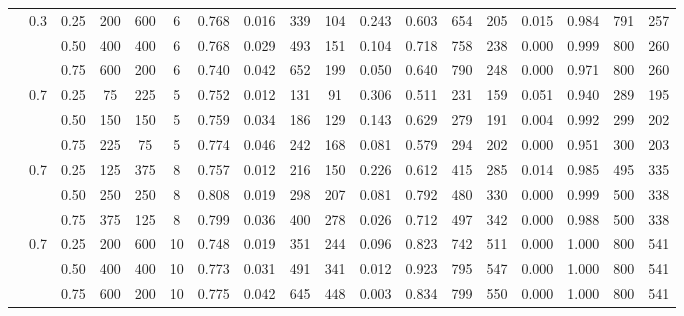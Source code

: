 \begin{table}
\begin{tabular}[t]{cccccccccccccccccc}
\addlinespace
800 & 0.3 & 0.25 & 200 & 600 & 6 & 0.768 & 0.016 & 339 & 104 & 0.243 & 0.603 & 654 & 205 & 0.015 & 0.984 & 791 & 257\\
 &  & 0.50 & 400 & 400 & 6 & 0.768 & 0.029 & 493 & 151 & 0.104 & 0.718 & 758 & 238 & 0.000 & 0.999 & 800 & 260\\
 &  & 0.75 & 600 & 200 & 6 & 0.740 & 0.042 & 652 & 199 & 0.050 & 0.640 & 790 & 248 & 0.000 & 0.971 & 800 & 260\\
\addlinespace
300 & 0.7 & 0.25 & 75 & 225 & 5 & 0.752 & 0.012 & 131 & 91 & 0.306 & 0.511 & 231 & 159 & 0.051 & 0.940 & 289 & 195\\
 &  & 0.50 & 150 & 150 & 5 & 0.759 & 0.034 & 186 & 129 & 0.143 & 0.629 & 279 & 191 & 0.004 & 0.992 & 299 & 202\\
 &  & 0.75 & 225 & 75 & 5 & 0.774 & 0.046 & 242 & 168 & 0.081 & 0.579 & 294 & 202 & 0.000 & 0.951 & 300 & 203\\
\addlinespace
500 & 0.7 & 0.25 & 125 & 375 & 8 & 0.757 & 0.012 & 216 & 150 & 0.226 & 0.612 & 415 & 285 & 0.014 & 0.985 & 495 & 335\\
 &  & 0.50 & 250 & 250 & 8 & 0.808 & 0.019 & 298 & 207 & 0.081 & 0.792 & 480 & 330 & 0.000 & 0.999 & 500 & 338\\
 &  & 0.75 & 375 & 125 & 8 & 0.799 & 0.036 & 400 & 278 & 0.026 & 0.712 & 497 & 342 & 0.000 & 0.988 & 500 & 338\\
\addlinespace
800 & 0.7 & 0.25 & 200 & 600 & 10 & 0.748 & 0.019 & 351 & 244 & 0.096 & 0.823 & 742 & 511 & 0.000 & 1.000 & 800 & 541\\
 &  & 0.50 & 400 & 400 & 10 & 0.773 & 0.031 & 491 & 341 & 0.012 & 0.923 & 795 & 547 & 0.000 & 1.000 & 800 & 541\\
 &  & 0.75 & 600 & 200 & 10 & 0.775 & 0.042 & 645 & 448 & 0.003 & 0.834 & 799 & 550 & 0.000 & 1.000 & 800 & 541\\
\bottomrule
\end{tabular}
\end{table}


